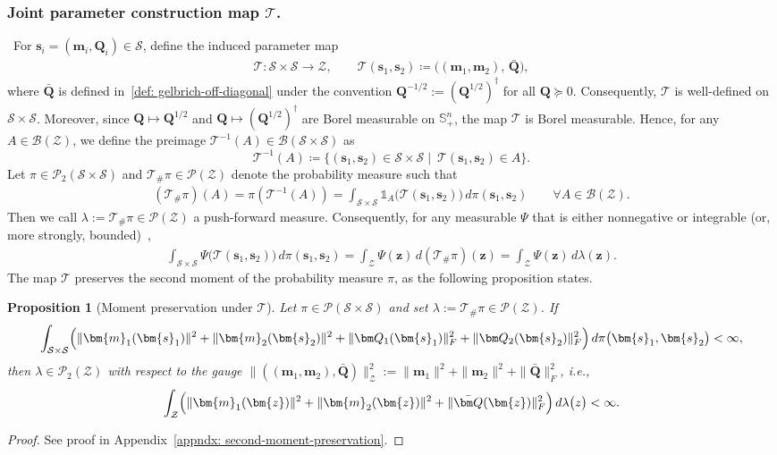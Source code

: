 \documentclass[opre,sglanonrev]{informs4}
\newtheorem{proposition}{Proposition}
\newcommand{\mT}{\mathcal{T}}
\newcommand{\mZ}{\mathcal{Z}}
\newcommand{\mS}{\mathcal{S}}
\newcommand{\mP}{\mathcal{P}}
\newcommand{\mB}{\mathcal{B}}
\newcommand{\mbS}{\mathbb S}
\newcommand{\ind}{\mathds{1}}
\newcommand{\bmean}{\bm{m}}
\newcommand{\bs}{\bm{s}}
\newcommand{\bz}{\bm{z}}
\newcommand{\bQ}{\bm Q}
\begin{document}
\subsubsection{\texorpdfstring{Joint parameter construction map $\mT$. }{Joint parameter construction map}}\, 
For $\bs_i=(\bmean_i,\bQ_i)\in\mS$, define the induced parameter map
\begin{align}\label{def: OT-map-forward}
\mT:\mS\times\mS\to\mZ,\qquad
\mT(\bs_1,\bs_2) \coloneqq \bigl((\bmean_1,\bmean_2),\,\bar{\bQ}\bigr),
\end{align}
where $\bar{\bQ}$ is defined in~\eqref{def: gelbrich-off-diagonal} under the convention
$\bQ^{-1/2}:=(\bQ^{1/2})^\dagger$ for all $\bQ\succeq 0$. Consequently, $\mT$ is well-defined on $\mS\times\mS$.
Moreover, since $\bQ\mapsto \bQ^{1/2}$ and $\bQ\mapsto (\bQ^{1/2})^\dagger$ are Borel measurable on $\mbS_+^n$,
the map $\mT$ is Borel measurable.
Hence, for any $A\in\mB(\mZ)$, we define the preimage $\mT^{-1}(A)\in\mB(\mS\times\mS)$ as
\[
\mT^{-1}(A) \coloneqq \{(\bs_1,\bs_2)\in\mS\times\mS \mid\ \mT(\bs_1,\bs_2)\in A\}.
\]
Let $\pi\in\mP_2(\mS\times\mS)$ and $\mT_\#\pi\in\mP(\mZ)$ denote the probability measure such that
\begin{align*}
 (\mT_\#\pi)(A)=\pi(\mT^{-1}(A))
=\int_{\mS\times\mS}\ind_A\!\bigl(\mT(\bs_1,\bs_2)\bigr)\,d\pi(\bs_1,\bs_2)
\qquad \forall A\in\mB(\mZ).
\end{align*}
Then we call $\lambda := \mT_\# \pi \in \mP(\mZ)$ a push-forward measure. Consequently, for any measurable $\Psi$ that is either nonnegative or integrable (or, more strongly, bounded)~\cite{villani2008optimal},
\begin{align}\label{eq: push-integral}
\int_{\mS\times\mS}\Psi\!\bigl(\mT(\bs_1,\bs_2)\bigr)\,d\pi(\bs_1,\bs_2)
=\int_{\mZ}\Psi(\bz)\,d(\mT_\#\pi)(\bz)
=\int_{\mZ}\Psi(\bz)\,d\lambda(\bz).
\end{align}
The map $\mT$ preserves the second moment of the probability measure $\pi$, as the following proposition states.


\begin{proposition}[Moment preservation under $\mT$]\label{prop: finite-GMM-mmnt}
Let $\pi\in \mP(\mS\times \mS)$ and set $\lambda:=\mT_\#\pi\in \mP(\mZ)$. 
If
\begin{equation}\label{eq:assump-input}
\int_{\mS\times\mS}\Bigl(\|\bmean_1(\bs_1)\|^2+\|\bmean_2(\bs_2)\|^2+\|\bQ_1(\bs_1)\|_F^2+\|\bQ_2(\bs_2)\|_F^2\Bigr)\,
d\pi\bigl(\bs_1, \bs_2\bigr) < \infty,
\end{equation}
then $\lambda\in \mP_2(\mZ)$ with respect to the gauge
$\|((\bmean_1,\bmean_2),\bar{\bQ})\|_{\mZ}^2 := \|\bmean_1\|^2+\|\bmean_2\|^2+\|\bar{\bQ}\|_F^2$, i.e.,
\begin{equation}\label{eq:concl-output}
\int_{\mZ}\Bigl(\|\bmean_1(\bz)\|^2+\|\bmean_2(\bz)\|^2+\|\bar{\bQ}(\bz)\|_F^2\Bigr)\,
d\lambda\bigl(z\bigr) < \infty.
\end{equation}
\end{proposition}
\begin{proof}
    See proof in Appendix~\ref{appndx: second-moment-preservation}.
\end{proof}
\end{document}
